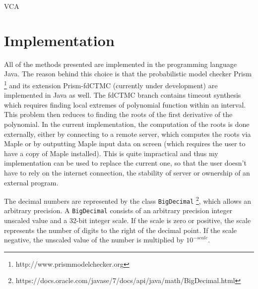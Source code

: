 \documentclass[
  digital, %
  table,   %
  nolof,     %
  nolot,     %
	draft, %
]{fithesis3}
\begin{document}
\begin{algorithm}
  \caption{VCA
    \label{alg:vca}}
  \begin{algorithmic}[1]
    \Statex
				\State\Return{$\emptyset$}
			\EndIf
				\State{}
			\EndIf
				\State{}
			\EndIf
				\State{}
			\Else
				\State{}
			\EndIf
    \EndFunction
  \end{algorithmic}
\end{algorithm}

\chapter{Implementation}
All of the methods presented are implemented in the programming language Java. The reason behind this choice is that the probabilistic model checker Prism \footnote{http://www.prismmodelchecker.org} and its extension Prism-fdCTMC (currently under development) are implemented in Java as well. The fdCTMC branch contains timeout synthesis \parencite{DBLP:conf/mascots/KorenciakKR16} which requires finding local extremes of polynomial function within an interval. This problem then reduces to finding the roots of the first derivative of the polynomial. In the current implementation, the computation of the roots is done externally, either by connecting to a remote server, which computes the roots via Maple or by outputting Maple input data on screen (which requires the user to have a copy of Maple installed). This is quite impractical and thus my implementation can be used to replace the current one, so that the user doesn't have to rely on the internet connection, the stability of server or ownership of an external program.

The decimal numbers are represented by the class \texttt{BigDecimal} \footnote{https://docs.oracle.com/javase/7/docs/api/java/math/BigDecimal.html}, which allows an arbitrary precision. A \texttt{BigDecimal} consists of an arbitrary precision integer unscaled value and a 32-bit integer scale. If the scale is zero or positive, the scale represents the number of digits to the right of the decimal point. If the scale negative, the unscaled value of the number is multiplied by $10^{-scale}$.
\end{document}
